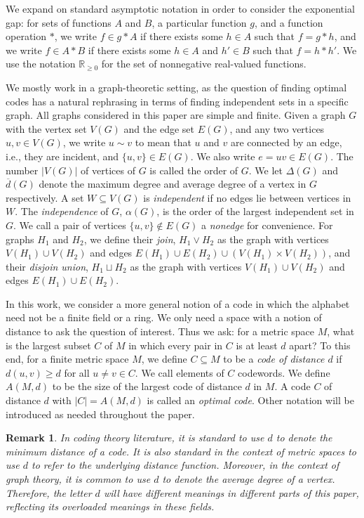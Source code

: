 \documentclass[12pt]{article}
\newtheorem{remark}{Remark}
\begin{document}
We expand on standard asymptotic notation in order to consider the exponential gap: for sets of functions $A$ and $B$, a particular function $g$, and a function operation $\ast$, we  write $f\in g\ast A$ if there exists some $h\in A$ such that $f=g\ast h$, and we write $f\in A\ast B$ if there exists some $h\in A$ and $h'\in B$ such that $f=h\ast h'$. We use the notation $\mathbb R_{\geq0}$ for the set of nonnegative real-valued functions.

We mostly work in a graph-theoretic setting, as the question of finding optimal codes has a natural rephrasing in terms of finding independent sets in a specific graph.   All graphs considered in this paper are simple and finite. Given a graph $G$ with the vertex set $V(G)$ and the edge set $E(G)$, and any two vertices $u,v \in V(G)$, we write $u\sim v$  to mean that $u$ and $v$ are connected by an edge, i.e., they are incident, and $\{ u,v\} \in E(G)$. We also write $e=uv\in E(G)$. The number $|V(G)|$ of vertices of $G$ is called the order of $G$. We let $\Delta(G)$ and $\overline d(G)$ denote the maximum degree and average degree of a vertex in $G$ respectively. A set $W\subseteq V(G)$ is \textit{independent} if no edges lie between vertices in $W$. The \textit{independence} of $G$, $\alpha(G)$, is the order of the largest independent set in $G$. We call a pair of vertices $\{u,v\}\not\in E(G)$ a \textit{nonedge} for convenience. For graphs $H_1$ and $H_2$, we  define their \textit{join}, $H_1\vee H_2$ as the graph with vertices $V(H_1)\cup V(H_2)$ and edges $E(H_1)\cup E(H_2)\cup (V(H_1)\times V(H_2))$, and their \textit{disjoin union}, $H_1\sqcup H_2$ as the graph with vertices $V(H_1)\cup V(H_2)$ and edges $E(H_1)\cup E(H_2)$.

In this work, we consider a more general notion of a code in which the alphabet need not be a finite field or a ring.  We only need a space with a notion of distance to ask the question of interest. Thus we ask: for a metric space $M$, what is the largest subset $C$ of $M$ in which every pair in $C$ is at least $d$ apart? To this end, for a finite metric space $M$, we define $C\subseteq M$ to be a \textit{code of distance $d$} if $d(u,v)\geq d$ for all $u\not=v\in C$. We call elements of $C$ codewords. We  define \textit{$A(M,d)$} to be the size of the largest code of distance $d$ in $M$. A code $C$ of distance $d$ with $|C|=A(M,d)$ is called an \textit{optimal code}. Other notation will be introduced as needed throughout the paper.

\begin{remark}
\label{rmk: d}
In coding theory literature, it is standard to use $d$ to denote the minimum distance of a code. It is also standard in the context of metric spaces to use $d$ to refer to the underlying distance function. Moreover, in the context of graph theory, it is common to use $d$ to denote the average degree of a vertex. Therefore, the letter $d$ will have different meanings in different parts of this paper, reflecting its overloaded meanings in these fields.
\end{remark}
\end{document}
